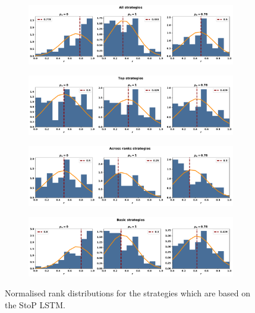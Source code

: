\begin{figure}[!htbp]
    \begin{subfigure}{\textwidth}
    \includegraphics[width=\textwidth]{src/chapters/07/img/normalised_rank_classification_all_strategies.pdf}
    \end{subfigure}
    \par\bigskip
    \begin{subfigure}{\textwidth}
    \includegraphics[width=\textwidth]{src/chapters/07/img/normalised_rank_classification_top_strategies.pdf}
    \end{subfigure}
    \par\bigskip
    \begin{subfigure}{\textwidth}
    \includegraphics[width=\textwidth]{src/chapters/07/img/normalised_rank_classification_across_ranks_strategies.pdf}
    \end{subfigure}
    \par\bigskip
    \begin{subfigure}{\textwidth}
    \includegraphics[width=\textwidth]{src/chapters/07/img/normalised_rank_classification_basic_strategies.pdf}
    \end{subfigure}
    \caption{Normalised rank distributions for the strategies which are based on the StoP
    LSTM.}\label{fig:normalised_rank_distributions_sequence_to_probability}
\end{figure}

